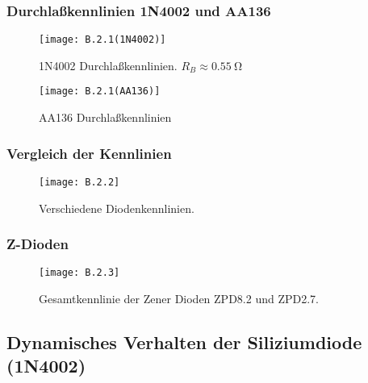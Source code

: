 \documentclass[
	a4paper, %
	12pt, %
]{CSUniSchoolLabReport}
\newcommand{\milli}{m}
\begin{document}
\subsubsection{Durchlaßkennlinien 1N4002 und AA136}
\begin{figure}[H] %
	\centering %
	\texttt{[image: B.2.1(1N4002)]} %
	\caption{1N4002 Durchlaßkennlinien. $R_B \approx \SI{0.55}{\ohm}$}
\end{figure}


\begin{figure}[H] %
	\centering %
	\texttt{[image: B.2.1(AA136)]} %
	\caption{AA136 Durchlaßkennlinien}
\end{figure}




\subsubsection{Vergleich der Kennlinien}
\begin{figure}[H] %
	\centering %
	\texttt{[image: B.2.2]} %
	\caption{Verschiedene Diodenkennlinien.}
\end{figure}

\subsubsection{Z-Dioden}

\begin{figure}[H] %
	\centering %
	\texttt{[image: B.2.3]} %
	\caption{Gesamtkennlinie der Zener Dioden ZPD8.2 und ZPD2.7.}
\end{figure}


\subsection{Dynamisches Verhalten der Siliziumdiode (1N4002)}
\end{document}
